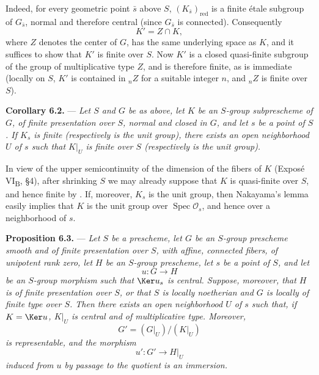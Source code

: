 \medskip
Indeed, for every geometric point \(\bar s\) above \(S\),
\((K_{\bar s})_{\mathrm{red}}\) is a finite étale subgroup of
\(G_{\bar s}\), normal and therefore central (since \(G_{\bar s}\)
is connected). Consequently
\[
  K'=Z\cap K,
\]
where \(Z\) denotes the center of \(G\), has the same underlying
space as \(K\), and it suffices to show that \(K'\) is finite over
\(S\). Now \(K'\) is a closed quasi-finite subgroup of the group
of multiplicative type \(Z\), and is therefore finite, as is
immediate (locally on \(S\), \(K'\) is contained in \({}_nZ\) for
a suitable integer \(n\), and \({}_nZ\) is finite over \(S\)).

\medskip
\noindent{}%
\textbf{Corollary 6.2.} --- \textit{Let \(S\) and \(G\) be as
above, let \(K\) be an \(S\)-group subprescheme of \(G\), of
finite presentation over \(S\), normal and closed in \(G\), and
let \(s\) be a point of \(S\). If \(K_s\) is finite (respectively
is the unit group), there exists an open neighborhood \(U\) of
\(s\) such that \(K|_U\) is finite over \(S\) (respectively is the
unit group).}

\medskip
In view of the upper semicontinuity of the dimension of the fibers
of \(K\) (Exposé VI\textsubscript{B}, \S4), after shrinking \(S\)
we may already suppose that \(K\) is quasi-finite over \(S\), and
hence finite by . If, moreover, \(K_s\) is the unit group, then
Nakayama's lemma easily implies that \(K\) is the unit group over
\(\operatorname{Spec}\mathcal O_s\), and hence over a neighborhood
of \(s\).

\medskip
\noindent{}%
\textbf{Proposition 6.3.} --- \textit{Let \(S\) be a prescheme,
let \(G\) be an \(S\)-group prescheme smooth and of finite
presentation over \(S\), with affine, connected fibers, of
unipotent rank zero, let \(H\) be an \(S\)-group prescheme, let
\(s\) be a point of \(S\), and let}
\[
  u:G\longrightarrow H
\]
\textit{be an \(S\)-group morphism such that \(\Ker u_s\) is
central. Suppose, moreover, that \(H\) is of finite presentation
over \(S\), or that \(S\) is locally noetherian and \(G\) is
locally of finite type over \(S\). Then there exists an open
neighborhood \(U\) of \(s\) such that, if \(K=\Ker u\), \(K|_U\)
is central and of multiplicative type. Moreover,}
\[
  G'=(G|_U)/(K|_U)
\]
\textit{is representable, and the morphism}
\[
  u':G'\longrightarrow H|_U
\]
\textit{induced from \(u\) by passage to the quotient is an
immersion.}

